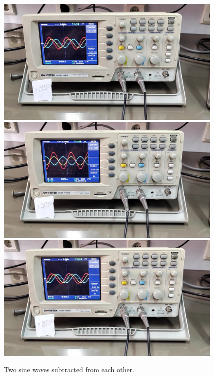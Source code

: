 \documentclass[11pt]{article}
\begin{document}
\begin{question}
{        \begin{figure}[H]
            \begin{center}
                \includegraphics[scale=0.1]{Fig/27.png}
                \includegraphics[scale=0.1]{Fig/28.png}
                \includegraphics[scale=0.1]{Fig/29.png}
                \caption{Two sine waves subtracted from each other.}
            \end{center}
        \end{figure}

}
\end{question}
\end{document}
